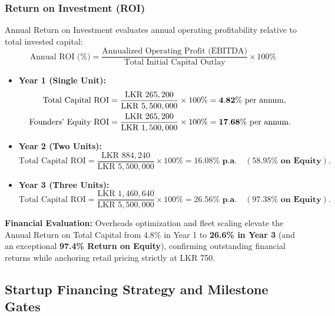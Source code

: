 \subsubsection{Return on Investment (ROI)}
Annual Return on Investment evaluates annual operating profitability relative to total invested capital:
\begin{equation}
    \text{Annual ROI (\%)} = \frac{\text{Annualized Operating Profit (EBITDA)}}{\text{Total Initial Capital Outlay}} \times 100\%
\end{equation}
\begin{itemize}[leftmargin=1.5em, itemsep=0.15em]
    \item \textbf{Year 1 (Single Unit):}
    \begin{align}
        \text{Total Capital ROI} &= \frac{\text{LKR } 265,200}{\text{LKR } 5,500,000} \times 100\% = \mathbf{4.82\% \text{ per annum}}, \notag \\
        \text{Founders' Equity ROI} &= \frac{\text{LKR } 265,200}{\text{LKR } 1,500,000} \times 100\% = \mathbf{17.68\% \text{ per annum}}.
    \end{align}
    \item \textbf{Year 2 (Two Units):}
    \begin{equation}
        \text{Total Capital ROI} = \frac{\text{LKR } 884,240}{\text{LKR } 5,500,000} \times 100\% = \mathbf{16.08\% \text{ p.a.}} \quad (\mathbf{58.95\% \text{ on Equity}}).
    \end{equation}
    \item \textbf{Year 3 (Three Units):}
    \begin{equation}
        \text{Total Capital ROI} = \frac{\text{LKR } 1,460,640}{\text{LKR } 5,500,000} \times 100\% = \mathbf{26.56\% \text{ p.a.}} \quad (\mathbf{97.38\% \text{ on Equity}}).
    \end{equation}
\end{itemize}

\textbf{Financial Evaluation:} Overheads optimization and fleet scaling elevate the Annual Return on Total Capital from 4.8\% in Year 1 to \textbf{26.6\% in Year 3} (and an exceptional \textbf{97.4\% Return on Equity}), confirming outstanding financial returns while anchoring retail pricing strictly at LKR 750.

\subsection{Startup Financing Strategy and Milestone Gates}
\label{subsec:financing_strategy}

